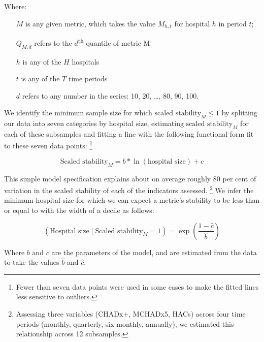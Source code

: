 \documentclass[submission]{grattan}
\begin{document}
Where:

\begin{itemize}
\item[\(M\)] is any given metric, which takes the value \(M_{h,t}\) for hospital \(h\) in period \(t\);
\item[\(Q_{M,d}\)] refers to the \(d\)\textsuperscript{th} quantile of metric M
\item[\(h\)] is any of the \(H\) hospitals
\item[\(t\)] is any of the \(T\) time periods
\item[\(d\)] refers to any number in the series: 10, 20, \dots{}, 80, 90, 100.
\end{itemize}

We identify the minimum sample size for which \(\text{scaled stability}_{M} \leq 1\) by splitting our data into seven categories by hospital size, estimating \(\text{scaled stability}_{M}\) for each of these subsamples and fitting a line with the following functional form fit to these seven data points:%
  \footnote{Fewer than seven data points were used in some cases to make the fitted lines less sensitive to outliers.}

\[\text{Scaled stability}_{M} = b*\ln\left( \text{hospital\ size} \right) + c\]

This simple model specification explains about on average roughly 80 per cent of variation in the scaled stability of each of the indicators assessed.%
\footnote{Assessing three variables (CHADx+, MCHADx5, HACs) across four time periods (monthly, quarterly, six-monthly, annually), we estimated this relationship across 12 subsamples.}
We infer the minimum hospital size for which we can expect a metric's stability to be less than or equal to with the width of a decile as follows:

\[(\text{Hospital size} \mid \text{Scaled stability}_{M} = 1) = \exp\left( \frac{1 - \hat{c}}{\hat{b}} \right)\]

Where \(b\) and \(c\) are the parameters of the model, and are estimated from the data to take the values \(\hat{b}\) and \(\hat{c}\).
\end{document}
